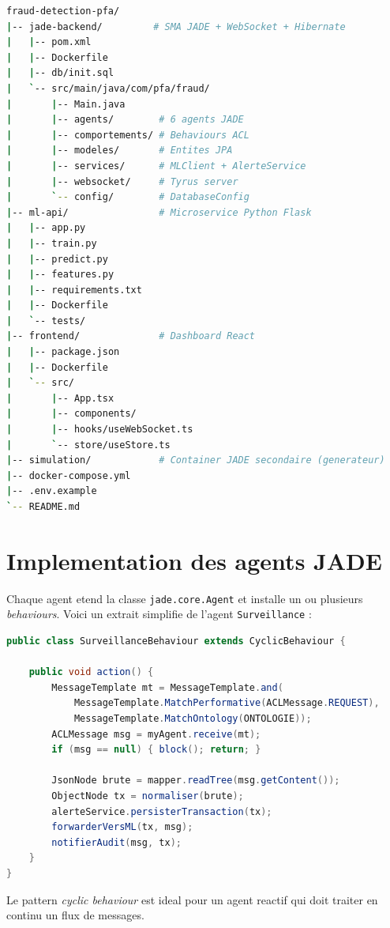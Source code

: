 \documentclass[12pt,a4paper,oneside]{report}
\begin{document}
\begin{lstlisting}[language=bash,caption={Arborescence du projet},label=lst:arbo]
fraud-detection-pfa/
|-- jade-backend/         # SMA JADE + WebSocket + Hibernate
|   |-- pom.xml
|   |-- Dockerfile
|   |-- db/init.sql
|   `-- src/main/java/com/pfa/fraud/
|       |-- Main.java
|       |-- agents/        # 6 agents JADE
|       |-- comportements/ # Behaviours ACL
|       |-- modeles/       # Entites JPA
|       |-- services/      # MLClient + AlerteService
|       |-- websocket/     # Tyrus server
|       `-- config/        # DatabaseConfig
|-- ml-api/                # Microservice Python Flask
|   |-- app.py
|   |-- train.py
|   |-- predict.py
|   |-- features.py
|   |-- requirements.txt
|   |-- Dockerfile
|   `-- tests/
|-- frontend/              # Dashboard React
|   |-- package.json
|   |-- Dockerfile
|   `-- src/
|       |-- App.tsx
|       |-- components/
|       |-- hooks/useWebSocket.ts
|       `-- store/useStore.ts
|-- simulation/            # Container JADE secondaire (generateur)
|-- docker-compose.yml
|-- .env.example
`-- README.md
\end{lstlisting}

\section{Implementation des agents JADE}

Chaque agent etend la classe \texttt{jade.core.Agent} et installe un ou
plusieurs \emph{behaviours}. Voici un extrait simplifie de l'agent
\texttt{Surveillance} :

\begin{lstlisting}[language=Java,caption={Extrait de SurveillanceBehaviour},label=lst:surv]
public class SurveillanceBehaviour extends CyclicBehaviour {

    public void action() {
        MessageTemplate mt = MessageTemplate.and(
            MessageTemplate.MatchPerformative(ACLMessage.REQUEST),
            MessageTemplate.MatchOntology(ONTOLOGIE));
        ACLMessage msg = myAgent.receive(mt);
        if (msg == null) { block(); return; }

        JsonNode brute = mapper.readTree(msg.getContent());
        ObjectNode tx = normaliser(brute);
        alerteService.persisterTransaction(tx);
        forwarderVersML(tx, msg);
        notifierAudit(msg, tx);
    }
}
\end{lstlisting}

Le pattern \emph{cyclic behaviour} est ideal pour un agent reactif qui doit
traiter en continu un flux de messages.
\end{document}
